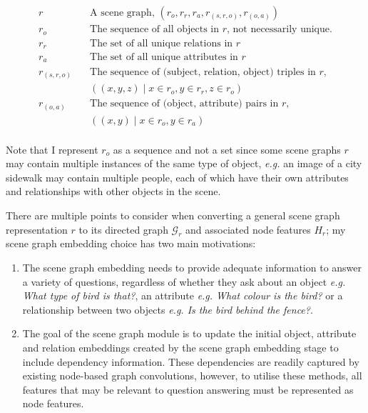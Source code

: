 \begin{align*}
    r \quad & \text{A scene graph, } (r_o, r_r, r_a, r_{(s,r,o)}, r_{(o, a)})\\
    r_o \quad  & \text{The sequence of all objects in \(r\), not necessarily unique.}\\
    r_r \quad & \text{The set of all unique relations in \(r\)}\\
    r_a \quad & \text{The set of all unique attributes in \(r\)}\\
    r_{(s,r,o)} \quad & \text{The sequence of (subject, relation, object) triples in } r,\\
    & ((x, y, z) \mid x \in r_o, y \in r_r, z \in r_o)\\
    r_{(o, a)} \quad & \text{The sequence of (object, attribute) pairs in \(r\),}\\
    & ((x, y) \mid x \in r_o, y \in r_a)\\
\end{align*}

Note that I represent \(r_o\) as a sequence and not a set since some scene graphs \(r\) may contain multiple instances of the same type of object, \textit{e.g.} an image of a city sidewalk may contain multiple people, each of which have their own attributes and relationships with other objects in the scene.

There are multiple points to consider when converting a general scene graph representation \(r\) to its directed graph \(\mathcal{G}_r\) and associated node features \(H_r\); my scene graph embedding choice has two main motivations:

\begin{enumerate}
    \item The scene graph embedding needs to provide adequate information to answer a variety of questions, regardless of whether they ask about an object \textit{e.g. What type of bird is that?}, an attribute \textit{e.g. What colour is the bird?} or a relationship between two objects \textit{e.g. Is the bird behind the fence?}.
    \item The goal of the scene graph module is to update the initial object, attribute and relation embeddings created by the scene graph embedding stage to include dependency information. These dependencies are readily captured by existing node-based graph convolutions, however, to utilise these methods, all features that may be relevant to question answering must be represented as node features.
\end{enumerate}

